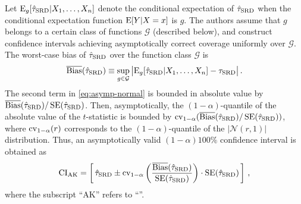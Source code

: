 Let $\operatorname{E}_g[\hat{\tau}_{\textup{SRD}} | X_1, \dots, X_n]$ denote the conditional expectation of $\hat{\tau}_{\textup{SRD}}$ when the conditional expectation function $\operatorname{E}[Y | X=x]$ is $g$.
The authors assume that $g$ belongs to a certain class of functions $\mathcal{G}$ (described below),
and construct confidence intervals achieving asymptotically correct coverage uniformly over $\mathcal{G}$. 
The worst-case bias of $\hat{\tau}_{\textup{SRD}}$ over the function class $\mathcal{G}$ is
\begin{equation}
	\overline{\operatorname{Bias}}(\hat{\tau}_{\textup{SRD}}) \equiv \sup_{g \in \mathcal{G}} \, \bigl\lvert \operatorname{E}_g[\hat{\tau}_{\textup{SRD}} | X_1, \dots, X_n] - \tau_{\textup{SRD}} \bigr\rvert \,.
\end{equation}
The second term in \eqref{eq:asymp-normal} is bounded in absolute value by $\overline{\operatorname{Bias}}(\hat{\tau}_{\textup{SRD}}) / \operatorname{SE}(\hat{\tau}_{\textup{SRD}})$.
Then, asymptotically, the $(1-\alpha)$-quantile of the absolute value of the $t$-statistic is bounded by $\operatorname{cv}_{1-\alpha}(\overline{\operatorname{Bias}}(\hat{\tau}_{\textup{SRD}}) / \operatorname{SE}(\hat{\tau}_{\textup{SRD}}))$,
where $\operatorname{cv}_{1-\alpha}(r)$ corresponds to the $(1-\alpha)$-quantile of the $\lvert \mathcal{N}(r, 1) \rvert$ distribution. 
Thus, an asymptotically valid $(1-\alpha)100\%$ confidence interval is obtained as
\vspace{2ex}
\begin{equation}
	\text{CI}_{\text{AK}} = \left[\, \tauhatSRD \pm \cv_{1-\alpha}\left(\frac{\overline{\Bias}(\tauhatSRD)}{\SE(\tauhatSRD)}\right) \cdot \SE(\tauhatSRD) \,\right] \,,
\vspace{1ex}
\end{equation} 
where the subscript \enquote{AK} refers to \enquote{\citeauthor{Armstrong_2020}}.

